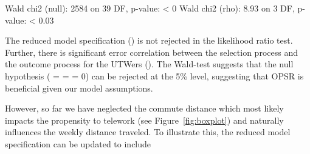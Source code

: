 \documentclass[%
    twoside, openright, titlepage, numbers=noenddot,%
    cleardoublepage=empty,%
    abstract=false,%
    BCOR=5.5mm, paper=a5, fontsize=10pt,%
]{scrreprt}
\begin{document}
\begin{Schunk}
\begin{Soutput}
Wald chi2 (null): 2584 on 39 DF, p-value: < 0
Wald chi2 (rho): 8.93 on 3 DF, p-value: < 0.03
\end{Soutput}
\end{Schunk}
%
The reduced model specification () is not rejected in the likelihood ratio test. Further, there is significant error correlation between the selection process and the outcome process for the UTWers (). The Wald-test suggests that the null hypothesis ( =  =  = 0) can be rejected at the 5\% level, suggesting that OPSR is beneficial given our model assumptions.

However, so far we have neglected the commute distance which most likely impacts the propensity to telework (see Figure~\ref{fig:boxplot}) and naturally influences the weekly distance traveled. To illustrate this, the reduced model specification can be updated to include 
%
\end{document}
